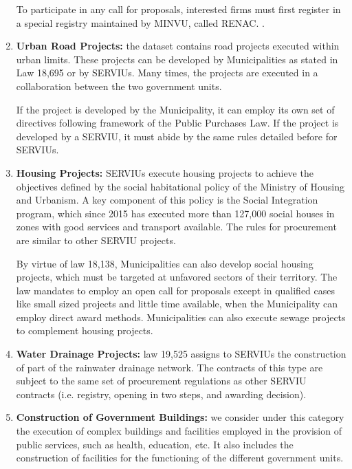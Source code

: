 \begin{enumerate}[wide, labelwidth=!,labelindent=0pt,label=\textbf{\arabic*}.]
To participate in any call for proposals, interested firms must first register in a special registry maintained by MINVU, called RENAC. .

\item \textbf{Urban Road Projects:} the dataset contains road projects executed within urban limits. These projects can be developed by Municipalities as stated in Law 18,695 or by SERVIUs. Many times, the projects are executed in a collaboration between the two government units.

If the project is developed by the Municipality, it can employ its own set of directives following framework of the Public Purchases Law. If the project is developed by a SERVIU, it must abide by the same rules detailed before for SERVIUs.

\item \textbf{Housing Projects:} SERVIUs execute housing projects to achieve the objectives defined by the social habitational policy of the Ministry of Housing and Urbanism. A key component of this policy is the Social Integration program, which since 2015 has executed more than 127,000 social houses in zones with good services and transport available. The rules for procurement are similar to other SERVIU projects.

By virtue of law 18,138, Municipalities can also develop social housing projects, which must be targeted at unfavored sectors of their territory. The law mandates to employ an open call for proposals except in qualified cases like small sized projects and little time available, when the Municipality can employ direct award methods. Municipalities can also execute sewage projects to complement housing projects.

\item \textbf{Water Drainage Projects:} law 19,525 assigns to SERVIUs the construction of part of the rainwater drainage network. The contracts of this type are subject to the same set of procurement regulations as other SERVIU contracts (i.e. registry, opening in two steps, and awarding decision).

\item \textbf{Construction of Government Buildings:} we consider under this category the execution of complex buildings and facilities employed in the provision of public services, such as health, education, etc. It also includes the construction of facilities for the functioning of the different government units.


\end{enumerate}
